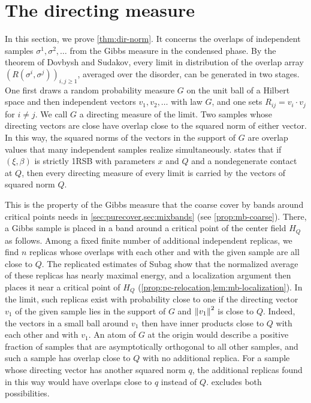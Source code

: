 \chapter{The directing measure}\label{sec:directing}

In this section, we prove \cref{thm:dir-norm}. It concerns the overlaps of independent samples $\sigma^1,\sigma^2,\dots$ from the Gibbs measure in the condensed phase. By the theorem of Dovbysh and Sudakov, every limit in distribution of the overlap array $(R(\sigma^i,\sigma^j))_{i,j\ge1}$, averaged over the disorder, can be generated in two stages. One first draws a random probability measure $G$ on the unit ball of a Hilbert space and then independent vectors $v_1,v_2,\dots$ with law $G$, and one sets $R_{ij}=v_i\cdot v_j$ for $i\ne j$. We call $G$ a directing measure of the limit. Two samples whose directing vectors are close have overlap close to the squared norm of either vector. In this way, the squared norms of the vectors in the support of $G$ are overlap values that many independent samples realize simultaneously.  states that if $(\xi,\beta)$ is strictly 1RSB with parameters $x$ and $Q$ and a nondegenerate contact at $Q$, then every directing measure of every limit is carried by the vectors of squared norm $Q$.

This is the property of the Gibbs measure that the coarse cover by bands around critical points needs in \cref{sec:purecover,sec:mixbands} (see \cref{prop:mb-coarse}). There, a Gibbs sample is placed in a band around a critical point of the center field $H_Q$ as follows. Among a fixed finite number of additional independent replicas, we find $n$ replicas whose overlaps with each other and with the given sample are all close to $Q$. The replicated estimates of Subag \cite{Subag2024} show that the normalized average of these replicas has nearly maximal energy, and a localization argument then places it near a critical point of $H_Q$ (\cref{prop:pc-relocation,lem:mb-localization}). In the limit, such replicas exist with probability close to one if the directing vector $v_1$ of the given sample lies in the support of $G$ and $\left\lVert v_1\right\rVert^2$ is close to $Q$. Indeed, the vectors in a small ball around $v_1$ then have inner products close to $Q$ with each other and with $v_1$. An atom of $G$ at the origin would describe a positive fraction of samples that are asymptotically orthogonal to all other samples, and such a sample has overlap close to $Q$ with no additional replica. For a sample whose directing vector has another squared norm $q$, the additional replicas found in this way would have overlaps close to $q$ instead of $Q$.  excludes both possibilities.

